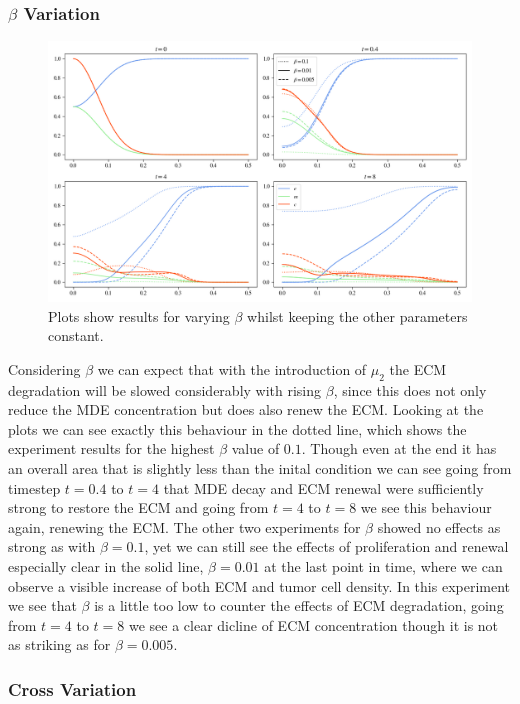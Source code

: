 \subsubsection*{$\beta$ Variation}
\begin{figure}[h!]
    \centering
    \includegraphics[width=\textwidth]{resources/images/prolif_beta_variation.png}
    \caption{Plots show results for varying $\beta$ whilst keeping the other parameters constant.}
    \label{fig:prolif_beta_variation}
\end{figure}

Considering $\beta$ we can expect that with the introduction of $\mu_2$ the ECM degradation will be slowed considerably with rising $\beta$, since this does not only reduce the MDE concentration but does also renew the ECM. Looking at the plots we can see exactly this behaviour in the dotted line, which shows the experiment results for the highest $\beta$ value of $0.1$. Though even at the end it has an overall area that is slightly less than the inital condition we can see going from timestep $t=0.4$ to $t=4$ that MDE decay and ECM renewal were sufficiently strong to restore the ECM and going from $t=4$ to $t=8$ we see this behaviour again, renewing the ECM. The other two experiments for $\beta$ showed no effects as strong as with $\beta=0.1$, yet we can still see the effects of proliferation and renewal especially clear in the solid line, $\beta=0.01$ at the last point in time, where we can observe a visible increase of both ECM and tumor cell density. In this experiment we see that $\beta$ is a little too low to counter the effects of ECM degradation, going from $t=4$ to $t=8$ we see a clear dicline of ECM concentration though it is not as striking as for $\beta=0.005$. 

\subsubsection*{Cross Variation}

